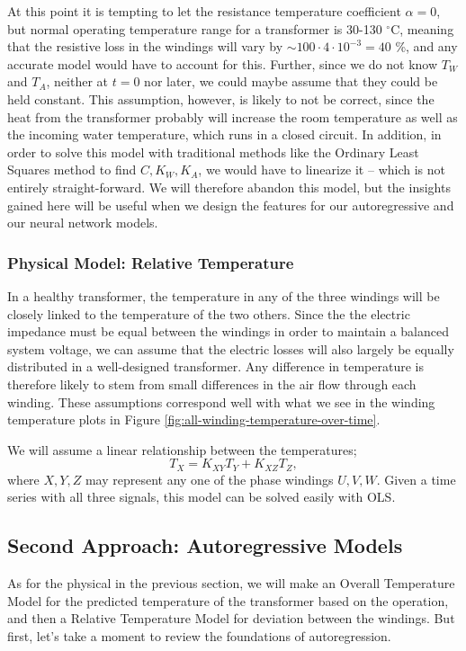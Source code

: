 \documentclass[]{article}
\begin{document}
At this point it is tempting to let the resistance temperature coefficient $\alpha = 0$, but normal operating temperature range for a transformer is 30-130 $^\circ$C, meaning that the resistive loss in the windings will vary by $\sim 100 \cdot 4 \cdot 10^{-3} = 40 $ \%, and any accurate model would have to account for this. Further, since we do not know $T_W$ and $T_A$, neither at $t = 0$ nor later, we could maybe assume that they could be held constant. This assumption, however, is likely to not be correct, since the heat from the transformer probably will increase the room temperature as well as the incoming water temperature, which runs in a closed circuit. In addition, in order to solve this model with traditional methods like the Ordinary Least Squares method to find $C, K_W, K_A$, we would have to linearize it -- which is not entirely straight-forward. We will therefore abandon this model, but the insights gained here will be useful when we design the features for our autoregressive and our neural network models.

\subsubsection{Physical Model: Relative Temperature} \label{sec:physical-model-relative}
In a healthy transformer, the temperature in any of the three windings will be closely linked to the temperature of the two others. Since the the electric impedance must be equal between the windings in order to maintain a balanced system voltage, we can assume that the electric losses will also largely be equally distributed in a well-designed transformer. Any difference in temperature is therefore likely to stem from small differences in the air flow through each winding. These assumptions correspond well with what we see in the winding temperature plots in Figure \ref{fig:all-winding-temperature-over-time}.

We will assume a linear relationship between the temperatures;
\begin{equation} \label{eq:physical-relative}
	T_X = K_{XY} T_Y + K_{XZ} T_Z,
\end{equation}
where $X,Y,Z$ may represent any one of the phase windings $U,V,W$. Given a time series with all three signals, this model can be solved easily with OLS.

\subsection{Second Approach: Autoregressive Models} \label{sec:autoregressive-model}
As for the physical in the previous section, we will make an Overall Temperature Model for the predicted temperature of the transformer based on the operation, and then a Relative Temperature Model for deviation between the windings. But first, let's take a moment to review the foundations of autoregression.
\end{document}
